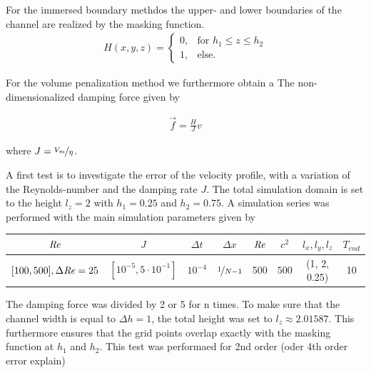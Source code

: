 
For the immersed boundary methdos the upper- and lower boundaries of the channel are realized by the masking function.
\begin{align}
H(x, y, z) = \begin{cases}
                    0, & \text{for \  }  h_1 \leq z \leq h_2 \\
                    1, & \text{else}.
             \end{cases}
\end{align}

For the volume penalization method we furthermore obtain a
The non-dimensionalized damping force  given by

\begin{align}
    \vec{f} = \frac{H}{J}v
\end{align}

where $J = \nicefrac{V_{m}}{\eta}$.

\clearpage

A first test is to investigate the error of the velocity profile, with a variation of the Reynolds-number and the damping rate $J$.
The total simulation domain is set to the height $l_z=2$ with $h_1=0.25$ and $h_2=0.75$.
A simulation series was performed with the main simulation parameters given by


\begin{center}
\vspace*{0.7ex}
\begin{tabular}{c|c|c|c|c|c|c|c }
 $ \mbox{\textit{Re}}  $                      & $J$ &  $\Delta t$ & $\Delta x$            & $\mbox{\textit{Re}}$  & $c^2$   & $l_x, l_y, l_z$ & $T_{end}$\\
\hline
 $[100, 500], \Delta \mbox{\textit{Re}} = 25 $& $[10^{-5}, 5\cdot10^{-1}]  $ &  $10^{-4}$ & $\nicefrac{1}{N - 1}$ & 500     & $500$   & (1, 2, 0.25)  & 10\\
\end{tabular}
\vspace*{0.7ex}
\end{center}

The damping force was divided by 2 or 5 for n times.
To make sure that the channel width is equal to $\Delta h = 1$, the total height was set to $l_z\approx2.01587$.
This furthermore ensures that the grid points overlap exactly
with the masking function at $h_1$ and $h_2$.
This test was performaed for 2nd order (oder 4th order error explain)

